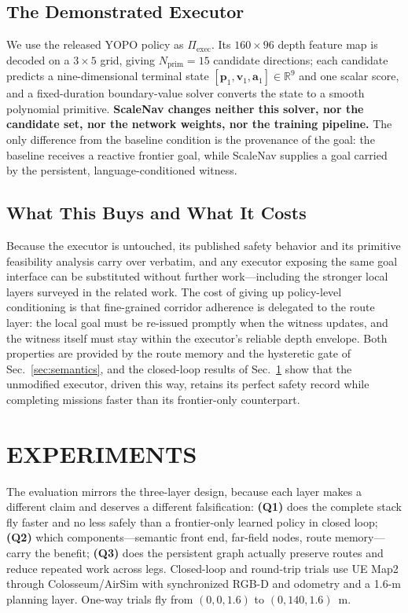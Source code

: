 \documentclass[letterpaper,10pt,conference]{ieeeconf}
\newcommand{\vect}[1]{\boldsymbol{#1}}
\newcommand{\R}{\mathbb{R}}
\begin{document}
\subsection{The Demonstrated Executor}
We use the released YOPO policy \cite{yopo} as $\Pi_{\mathrm{exec}}$.  Its
$160\times96$ depth feature map is decoded on a $3\times5$ grid, giving
$N_{\mathrm{prim}}=15$ candidate directions; each candidate predicts a
nine-dimensional terminal state
$[\vect{p}_1,\vect{v}_1,\vect{a}_1]\in\R^9$ and one scalar score, and a
fixed-duration boundary-value solver converts the state to a smooth
polynomial primitive.  \textbf{ScaleNav changes neither this solver, nor the
candidate set, nor the network weights, nor the training pipeline.}  The only
difference from the baseline condition is the provenance of the goal: the
baseline receives a reactive frontier goal, while ScaleNav supplies a goal
carried by the persistent, language-conditioned witness.

\subsection{What This Buys and What It Costs}
Because the executor is untouched, its published safety behavior and its
primitive feasibility analysis carry over verbatim, and any executor exposing
the same goal interface can be substituted without further work---including
the stronger local layers surveyed in the related work.  The cost of
giving up policy-level conditioning is that fine-grained corridor adherence
is delegated to the route layer: the local goal must be re-issued promptly
when the witness updates, and the witness itself must stay within the
executor's reliable depth envelope.  Both properties are provided by the
route memory and the hysteretic gate of Sec.~\ref{sec:semantics}, and the
closed-loop results of Sec.~\ref{sec:experiments} show that the unmodified
executor, driven this way, retains its perfect safety record while completing
missions faster than its frontier-only counterpart.

\section{EXPERIMENTS}
\label{sec:experiments}
The evaluation mirrors the three-layer design, because each layer makes a
different claim and deserves a different falsification:
\textbf{(Q1)} does the complete stack fly faster and no less safely than a
frontier-only learned policy in closed loop;
\textbf{(Q2)} which components---semantic front end, far-field nodes, route
memory---carry the benefit;
\textbf{(Q3)} does the persistent graph actually preserve routes and reduce
repeated work across legs.
Closed-loop and round-trip trials use UE Map2 through Colosseum/AirSim
\cite{airsim} with synchronized RGB-D and odometry and a 1.6-m planning
layer.  One-way trials fly from $(0,0,1.6)$ to $(0,140,1.6)$~m.
\end{document}
